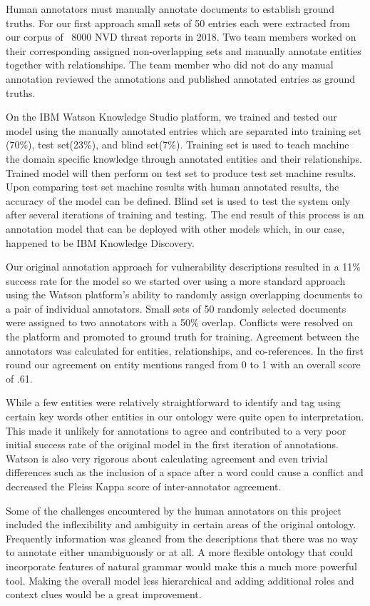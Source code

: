 \documentclass{article} %
\begin{document}
Human annotators must manually annotate documents to establish ground truths.  For our first approach small sets of 50 entries each were extracted from our corpus of ~8000 NVD threat reports in 2018.  Two team members worked on their corresponding assigned non-overlapping sets and manually annotate entities together with relationships. The team member who did not do any manual annotation reviewed the annotations and published annotated entries as ground truths.  

On the IBM Watson Knowledge Studio platform, we trained and tested our model using the manually annotated entries which are separated into training set (70\%), test set(23\%), and blind set(7\%). Training set is used to teach machine the domain specific knowledge through annotated entities and their relationships. Trained model will then perform on test set to produce test set machine results. Upon comparing test set machine results with human annotated results, the accuracy of the model can be defined. Blind set is used to test the system only after several iterations of training and testing. The end result of this process is an annotation model that can be deployed with other models which, in our case, happened to be IBM Knowledge Discovery.

Our original annotation approach for vulnerability descriptions resulted in a 11\% success rate for the model so we started over using a more standard approach using the Watson platform's ability to randomly assign overlapping documents to a pair of individual annotators.  Small sets of 50 randomly selected documents were assigned to two annotators with a 50\% overlap.  Conflicts were resolved on the platform and promoted to ground truth for training.  Agreement between the annotators was calculated for entities, relationships, and co-references.  In the first round our agreement on entity mentions ranged from 0 to 1 with an overall score of .61.

While a few entities were relatively straightforward to identify and tag using certain key words other entities in our ontology were quite open to interpretation.  This made it unlikely for annotations to agree and contributed to a very poor initial success rate of the original model in the first iteration of annotations.  Watson is also very rigorous about calculating agreement and even trivial differences such as the inclusion of a space after a word could cause a conflict and decreased the Fleiss Kappa score of inter-annotator agreement.  

Some of the challenges encountered by the human annotators on this project included the inflexibility and ambiguity in certain areas of the original ontology.  Frequently information was gleaned from the descriptions that there was no way to annotate either unambiguously or at all.  A more flexible ontology that could incorporate features of natural grammar would make this a much more powerful tool.  Making the overall model less hierarchical and adding additional roles and context clues would be a great improvement.
\end{document}
